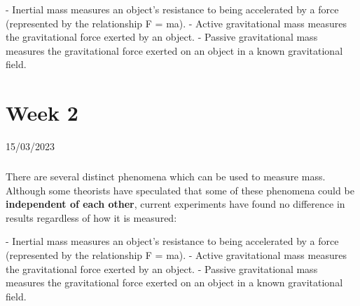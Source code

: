 \documentclass[12pt]{book}
\begin{document}
    - Inertial mass measures an object's resistance to being accelerated by a force (represented by the relationship F = ma).
    - Active gravitational mass measures the gravitational force exerted by an object.
    - Passive gravitational mass measures the gravitational force exerted on an object in a known gravitational field.
    
    \chapter{Week 2}
    \justifying
    \large
    15/03/2023 \\[10pt]
    
    \paragraph{}
    There are several distinct phenomena which can be used to measure mass. Although some theorists have speculated that some of these phenomena could be \textbf{independent of each other}, current experiments have found no difference in results regardless of how it is measured:
    
    - Inertial mass measures an object's resistance to being accelerated by a force (represented by the relationship F = ma).
    - Active gravitational mass measures the gravitational force exerted by an object.
    - Passive gravitational mass measures the gravitational force exerted on an object in a known gravitational field.
    
    
\end{document}
